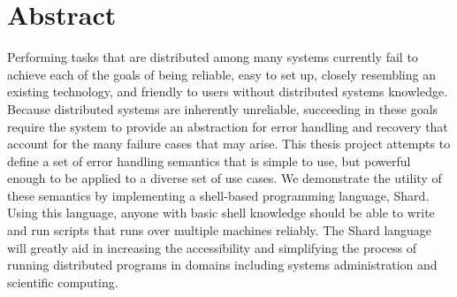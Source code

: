 \documentclass[twoside]{report}
\begin{document}



\tableofcontents
\listoffigures
\listoftables
\onehalfspacing

\chapter*{Abstract}

Performing tasks that are distributed among many systems currently fail to achieve each of the goals of being reliable, easy to set up, closely resembling an existing technology, and friendly to users without distributed systems knowledge.
Because distributed systems are inherently unreliable, succeeding in these goals require the system to provide an abstraction for error handling and recovery that account for the many failure cases that may arise.
This thesis project attempts to define a set of error handling semantics that is simple to use, but powerful enough to be applied to a diverse set of use cases.
We demonstrate the utility of these semantics by implementing a shell-based programming language, Shard.
Using this language, anyone with basic shell knowledge should be able to write and run scripts that runs over multiple machines reliably.
The Shard language will greatly aid in increasing the accessibility and simplifying the process of running distributed programs in domains including systems administration and scientific computing.
\end{document}
